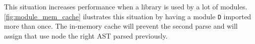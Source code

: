 This situation increases performance when a library is used by a lot of modules.
\autoref{fig:module_mem_cache} ilustrates this situation by having a module \texttt{D} imported more than once. The in-memory cache will prevent the second
parse and will assign that use node the right AST parsed previously.
